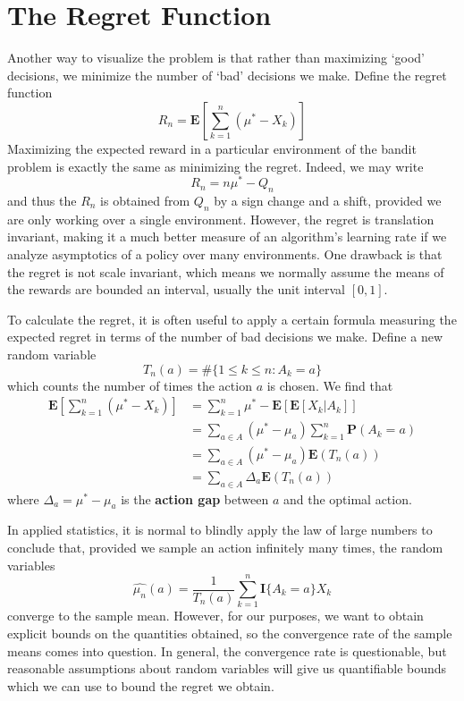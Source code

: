 \section{The Regret Function}

Another way to visualize the problem is that rather than maximizing `good' decisions, we minimize the number of `bad' decisions we make. Define the regret function
%
\[ R_n = \mathbf{E} \left[\sum_{k = 1}^n (\mu^* - X_k) \right] \]
%
Maximizing the expected reward in a particular environment of the bandit problem is exactly the same as minimizing the regret. Indeed, we may write
%
\[ R_n = n \mu^* - Q_n  \]
%
and thus the $R_n$ is obtained from $Q_n$ by a sign change and a shift, provided we are only working over a single environment. However, the regret is translation invariant, making it a much better measure of an algorithm's learning rate if we analyze asymptotics of a policy over many environments. One drawback is that the regret is not scale invariant, which means we normally assume the means of the rewards are bounded an interval, usually the unit interval $[0,1]$.

To calculate the regret, it is often useful to apply a certain formula measuring the expected regret in terms of the number of bad decisions we make. Define a new random variable
%
\[ T_n(a) = \# \{ 1 \leq k \leq n : A_k = a \} \]
%
which counts the number of times the action $a$ is chosen. We find that
%
\begin{align*}
    \mathbf{E} \left[\sum_{k = 1}^n (\mu^* - X_k) \right] &= \sum_{k = 1}^n \mu^* - \mathbf{E}[ \mathbf{E}[X_k | A_k] ]\\
    &= \sum_{a \in A} (\mu^* - \mu_a) \sum_{k = 1}^n \mathbf{P}(A_k = a)\\
    &= \sum_{a \in A} (\mu^* - \mu_a) \mathbf{E}(T_n(a))\\
    &= \sum_{a \in A} \Delta_a \mathbf{E}(T_n(a))
\end{align*}
%
where $\Delta_a = \mu^* - \mu_a$ is the {\bf action gap} between $a$ and the optimal action.

In applied statistics, it is normal to blindly apply the law of large numbers to conclude that, provided we sample an action infinitely many times, the random variables
%
\[ \widehat{\mu_n}(a) = \frac{1}{T_n(a)} \sum_{k = 1}^n \mathbf{I} \{A_k = a \} X_k \]
%
converge to the sample mean. However, for our purposes, we want to obtain explicit bounds on the quantities obtained, so the convergence rate of the sample means comes into question. In general, the convergence rate is questionable, but reasonable assumptions about random variables will give us quantifiable bounds which we can use to bound the regret we obtain.

